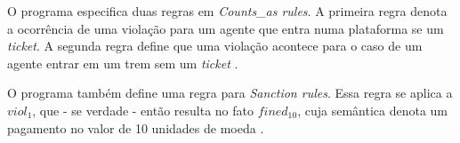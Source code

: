 O programa especifica duas regras em \textit{Counts\_as rules}. A primeira regra denota a ocorrência de uma violação para um agente que entra numa plataforma se um \textit{ticket}. A segunda regra define que uma violação acontece para o caso de um agente entrar em um trem sem um \textit{ticket} \cite{dastaniframework}.

O programa também define uma regra para \textit{Sanction rules}. Essa regra se aplica a $viol_1$, que - se verdade - então resulta no fato $fined_{10}$, cuja semântica denota um pagamento no valor de 10 unidades de moeda \cite{dastaniframework}.  

